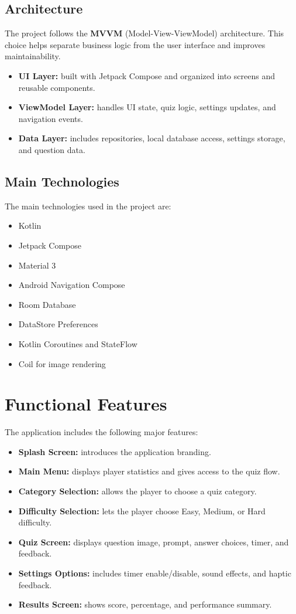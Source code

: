 \documentclass[12pt,a4paper]{article}
\begin{document}
\subsection{Architecture}
The project follows the \textbf{MVVM} (Model-View-ViewModel) architecture. This choice helps separate business logic from the user interface and improves maintainability.

\begin{itemize}[leftmargin=1.5em]
    \item \textbf{UI Layer:} built with Jetpack Compose and organized into screens and reusable components.
    \item \textbf{ViewModel Layer:} handles UI state, quiz logic, settings updates, and navigation events.
    \item \textbf{Data Layer:} includes repositories, local database access, settings storage, and question data.
\end{itemize}

\subsection{Main Technologies}
The main technologies used in the project are:

\begin{itemize}[leftmargin=1.5em]
    \item Kotlin
    \item Jetpack Compose
    \item Material 3
    \item Android Navigation Compose
    \item Room Database
    \item DataStore Preferences
    \item Kotlin Coroutines and StateFlow
    \item Coil for image rendering
\end{itemize}

\section{Functional Features}
The application includes the following major features:

\begin{itemize}[leftmargin=1.5em]
    \item \textbf{Splash Screen:} introduces the application branding.
    \item \textbf{Main Menu:} displays player statistics and gives access to the quiz flow.
    \item \textbf{Category Selection:} allows the player to choose a quiz category.
    \item \textbf{Difficulty Selection:} lets the player choose Easy, Medium, or Hard difficulty.
    \item \textbf{Quiz Screen:} displays question image, prompt, answer choices, timer, and feedback.
    \item \textbf{Settings Options:} includes timer enable/disable, sound effects, and haptic feedback.
    \item \textbf{Results Screen:} shows score, percentage, and performance summary.
\end{itemize}
\end{document}
